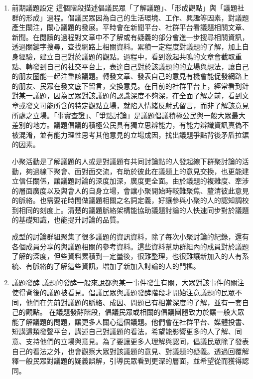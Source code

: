 \documentclass[12pt,a4paper]{article}
\begin{document}
\begin{enumerate}
\item 前期議題設定
\label{sec:org729de72}
這個階段描述倡議民眾「了解議題」、「形成觀點」與「議題社群的形成」過程。倡議民眾因為自己的生活環境、工作、興趣等因素，對議題產生關注，關心議題的發展。平時會在新聞平台、社群平台看議題相關文章、新聞。在閱讀的過程對文章中不了解或有疑義的部分會進一步搜尋相關資訊，透過關鍵字搜尋，查找網路上相關資料。累積一定程度對議題的了解，加上自身經驗，建立自己對於議題的觀點。過程中，看到激起共鳴的文章會截取重點、轉發到自己的社交平台上，表達自己對於該議題的的立場與想法，讓自己的朋友圈能一起注重該議題。轉發文章、發表自己的意見有機會能促發網路上的朋友、民眾在發文底下留言，交換意見。在目前的社群平台上，經常看到針對某一議題，因為民眾對該議題的認識深度不夠深，在全面了解之前，看到文章或發文可能所含的特定觀點立場，就陷入情緒反射式留言，而非了解該意見所處之立場。「事實查證」、「爭點討論」是議題倡議積極公民與一般大眾最大差別的地方。議題倡議的積極公民具有獨立思辨能力，有能力辨識資訊真偽不被混淆，並有能力理性思考其他意見的立場成因，找出議題爭點背後矛盾拉鋸的因素。

小聚活動是了解議題的人或是對議題有共同討論點的人發起線下群聚討論的活動，夠過線下聚會、面對面交流，有助於彼此在議題上的意見交換，也更能建立信任關係，讓議題討論的深度加深，廣度更全面。由於議題的複雜度、牽涉的層面廣度以及與會人的自身立場，會讓小聚開始時較難聚焦、釐清彼此意見的脈絡。也需要花時間做議題相關之名詞定義，好讓參與小聚的人的認知調校到相同的刻度上。清楚的議題脈絡架構能協助議題討論的人快速同步對於議題的基礎知識，也能提升討論的品質。

成型的討論群組聚集了很多議題的資訊資料，除了每次小聚討論的紀錄，還有各個成員分享的與議題相關的參考資料。這些資料幫助群組內的成員對於議題了解的深度，但些資料累積到一定量後，很難整理，也很難讓新加入的人有系統、有脈絡的了解這些資訊，增加了新加入討論的人的門檻。

\item 議題發酵
\label{sec:orgbe9817c}
議題的發酵一般來說都與某一事件發生有關，大眾對該事件的關注使得背後的議題被看見。倡議民眾與議題發酵階段才開始注意議題的民眾不同，他們在先前對議題的脈絡、成因、問題已有相當深度的了解，並有一套自己的觀點。 在議題發酵階段，倡議民眾或相關的倡議團體致力於讓一般大眾能了解議題的問題，讓更多人關心這個議題。他們會在社群平台、媒體投書、短講這類發聲平台，講述自己對議題的看法，希望能影響更多的人了解、同意、支持他們的立場與意見。為了要讓更多人理解與認同，倡議民眾除了發表自己的看法之外，也會觀察大眾對該議題的意見、對議題的疑義。透過回覆解釋一般民眾對議題的疑義誤解，引導民眾看到更深的層面，並希望從而獲得認同。


\end{enumerate}
\end{document}

